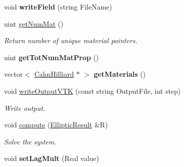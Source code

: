 \begin{DoxyCompactItemize}
\item 
\hypertarget{classvoom_1_1_phase_model_a4141cfbf63ac3bc8e7bcdb63d122fba2}{
void {\bfseries writeField} (string FileName)}
\label{classvoom_1_1_phase_model_a4141cfbf63ac3bc8e7bcdb63d122fba2}

\item 
\hypertarget{classvoom_1_1_phase_model_a21568b518bf6f1b5bad778b073d49b53}{
uint \hyperlink{classvoom_1_1_phase_model_a21568b518bf6f1b5bad778b073d49b53}{getNumMat} ()}
\label{classvoom_1_1_phase_model_a21568b518bf6f1b5bad778b073d49b53}

\begin{DoxyCompactList}\small\item\em Return number of unique material pointers. \item\end{DoxyCompactList}\item 
\hypertarget{classvoom_1_1_phase_model_adf02495472785a9ca0389677889a3f1a}{
uint {\bfseries getTotNumMatProp} ()}
\label{classvoom_1_1_phase_model_adf02495472785a9ca0389677889a3f1a}

\item 
\hypertarget{classvoom_1_1_phase_model_a49770878d694244118d0210742a6c526}{
vector$<$ \hyperlink{classvoom_1_1_cahn_hilliard}{CahnHilliard} $\ast$ $>$ {\bfseries getMaterials} ()}
\label{classvoom_1_1_phase_model_a49770878d694244118d0210742a6c526}

\item 
\hypertarget{classvoom_1_1_phase_model_a38df3949c0735d3b1041c74c72f3bead}{
void \hyperlink{classvoom_1_1_phase_model_a38df3949c0735d3b1041c74c72f3bead}{writeOutputVTK} (const string OutputFile, int step)}
\label{classvoom_1_1_phase_model_a38df3949c0735d3b1041c74c72f3bead}

\begin{DoxyCompactList}\small\item\em Write output. \item\end{DoxyCompactList}\item 
\hypertarget{classvoom_1_1_phase_model_a7d86d736e9a4cd462ee00af75380e684}{
void \hyperlink{classvoom_1_1_phase_model_a7d86d736e9a4cd462ee00af75380e684}{compute} (\hyperlink{structvoom_1_1_elliptic_result}{EllipticResult} \&R)}
\label{classvoom_1_1_phase_model_a7d86d736e9a4cd462ee00af75380e684}

\begin{DoxyCompactList}\small\item\em Solve the system. \item\end{DoxyCompactList}\item 
\hypertarget{classvoom_1_1_phase_model_a9f9649b5733b08ea40d03973ac91707d}{
void {\bfseries setLagMult} (Real value)}
\label{classvoom_1_1_phase_model_a9f9649b5733b08ea40d03973ac91707d}

\end{DoxyCompactItemize}
